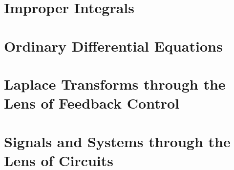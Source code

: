 \documentclass[letterpaper]{book}
\begin{document}
\chapter{Improper Integrals}
\label{chap:ImproperIntegrals}


\chapter{Ordinary Differential Equations}
\label{chap:ODEs}


\chapter{Laplace Transforms through the Lens of Feedback Control}
\label{chap:LaplaceTransformFeedbackControl}



\chapter{Signals and Systems through the Lens of Circuits}
\label{chap:SignalsSystems}





\pagestyle{plain}


% 


\end{document}
